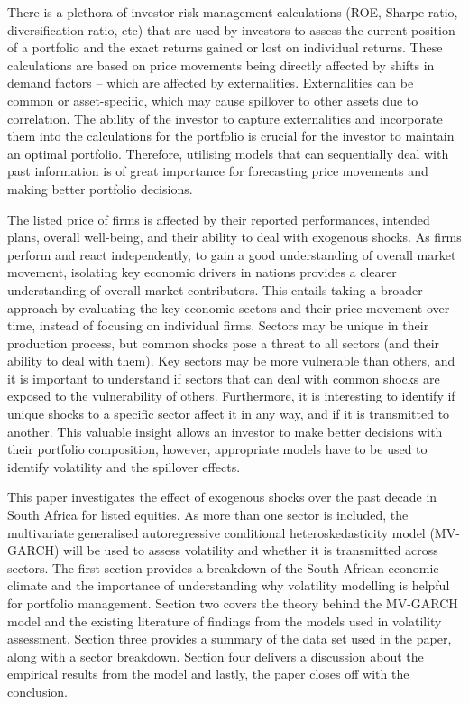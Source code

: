 \documentclass[11pt,preprint, authoryear]{elsarticle}
\numberwithin{equation}{section}
\numberwithin{figure}{section}
\numberwithin{table}{section}
\begin{document}
There is a plethora of investor risk management calculations (ROE,
Sharpe ratio, diversification ratio, etc) that are used by investors to
assess the current position of a portfolio and the exact returns gained
or lost on individual returns. These calculations are based on price
movements being directly affected by shifts in demand factors -- which
are affected by externalities. Externalities can be common or
asset-specific, which may cause spillover to other assets due to
correlation. The ability of the investor to capture externalities and
incorporate them into the calculations for the portfolio is crucial for
the investor to maintain an optimal portfolio. Therefore, utilising
models that can sequentially deal with past information is of great
importance for forecasting price movements and making better portfolio
decisions.

The listed price of firms is affected by their reported performances,
intended plans, overall well-being, and their ability to deal with
exogenous shocks. As firms perform and react independently, to gain a
good understanding of overall market movement, isolating key economic
drivers in nations provides a clearer understanding of overall market
contributors. This entails taking a broader approach by evaluating the
key economic sectors and their price movement over time, instead of
focusing on individual firms. Sectors may be unique in their production
process, but common shocks pose a threat to all sectors (and their
ability to deal with them). Key sectors may be more vulnerable than
others, and it is important to understand if sectors that can deal with
common shocks are exposed to the vulnerability of others. Furthermore,
it is interesting to identify if unique shocks to a specific sector
affect it in any way, and if it is transmitted to another. This valuable
insight allows an investor to make better decisions with their portfolio
composition, however, appropriate models have to be used to identify
volatility and the spillover effects.

This paper investigates the effect of exogenous shocks over the past
decade in South Africa for listed equities. As more than one sector is
included, the multivariate generalised autoregressive conditional
heteroskedasticity model (MV-GARCH) will be used to assess volatility
and whether it is transmitted across sectors. The first section provides
a breakdown of the South African economic climate and the importance of
understanding why volatility modelling is helpful for portfolio
management. Section two covers the theory behind the MV-GARCH model and
the existing literature of findings from the models used in volatility
assessment. Section three provides a summary of the data set used in the
paper, along with a sector breakdown. Section four delivers a discussion
about the empirical results from the model and lastly, the paper closes
off with the conclusion.
\end{document}

